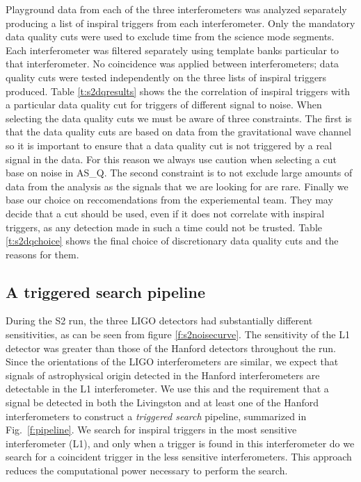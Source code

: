 Playground data from each of the three interferometers was analyzed separately
producing a list of inspiral triggers from each interferometer. Only the
mandatory data quality cuts were used to exclude time from the science mode
segments. Each interferometer was filtered separately using template banks
particular to that interferometer. No coincidence was applied between
interferometers; data quality cuts were tested independently on the three
lists of inspiral triggers produced. Table \ref{t:s2dqresults} shows the the
correlation of inspiral triggers with a particular data quality cut for
triggers of different signal to noise. When selecting the data quality cuts we
must be aware of three constraints. The first is that the data quality cuts
are based on data from the gravitational wave channel so it is important to
ensure that a data quality cut is not triggered by a real signal in the data.
For this reason we always use caution when selecting a cut base on noise in
AS\_Q.  The second constraint is to not exclude large amounts of data from the
analysis as the signals that we are looking for are rare. Finally we base our
choice on reccomendations from the experiemental team. They may decide that a
cut should be used, even if it does not correlate with inspiral triggers, as
any detection made in such a time could not be trusted. Table
\ref{t:s2dqchoice} shows the final choice of discretionary data quality cuts
and the reasons for them.

\subsection{A triggered search pipeline}
\label{ss:triggeredsearch}

During the S2 run, the three LIGO detectors had substantially different
sensitivities, as can be seen from figure \ref{f:s2noisecurve}. The
sensitivity of the L1 detector was greater than those of the Hanford detectors
throughout the run. Since the orientations of the LIGO interferometers are
similar, we expect that signals of astrophysical origin detected in the
Hanford interferometers are detectable in the L1 interferometer.  We use this
and the requirement that a signal be detected in both the Livingston and at
least one of the Hanford interferometers to construct a {\em triggered search}
pipeline, summarized in Fig.~\ref{f:pipeline}. We search for inspiral triggers
in the most sensitive interferometer (L1), and only when a trigger is found in
this interferometer do we search for a coincident trigger in the less
sensitive interferometers. This approach reduces the computational power
necessary to perform the search.


